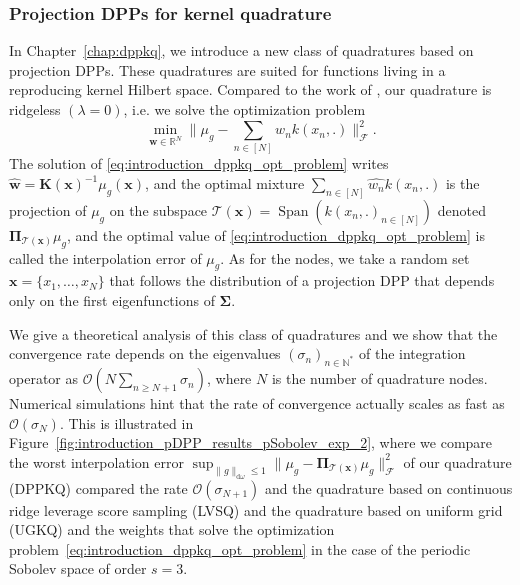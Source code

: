\documentclass[twoside,11pt]{book}
\numberwithin{theorem}{chapter}
\numberwithin{definition}{chapter}
\numberwithin{proposition}{chapter}
\numberwithin{corollary}{chapter}
\numberwithin{example}{chapter}
\numberwithin{lemma}{chapter}
\numberwithin{assumption}{chapter}
\numberwithin{equation}{chapter}
\numberwithin{figure}{chapter}
\DeclareMathOperator{\Span}{\mathrm{Span}}
\DeclareMathOperator{\F}{\mathcal{F}}
\begin{document}
\subsubsection{Projection DPPs for kernel quadrature}

In Chapter~\ref{chap:dppkq}, we introduce a new class of quadratures based on projection DPPs. These quadratures are suited for functions living in a reproducing kernel Hilbert space. Compared to the work of \cite{Bac17}, our quadrature is ridgeless $(\lambda = 0)$, i.e. we solve the optimization problem
\begin{equation}\label{eq:introduction_dppkq_opt_problem}
\min\limits_{\bm{w} \in \mathbb{R}^{N}} \|\mu_{g} - \sum\limits_{n \in [N]} w_{n}k(x_{n},.) \|_{\F}^{2}.
\end{equation}
 The solution of \eqref{eq:introduction_dppkq_opt_problem} writes $\hat{\bm{w}} = \bm{K}(\bm{x})^{-1} \mu_{g}(\bm{x})$, and the optimal mixture $\sum_{n \in [N]} \hat{w_{n}}k(x_n,.)$ is the projection of $\mu_{g}$ on the subspace $\mathcal{T}(\bm{x}) = \Span( k(x_{n},.)_{n \in [N]})$ denoted $\bm{\Pi}_{\mathcal{T}(\bm{x})}\mu_{g}$, and the optimal value of \eqref{eq:introduction_dppkq_opt_problem} is called the interpolation error of $\mu_{g}$. As for the nodes, we take a random set $\bm{x} = \{x_{1}, \dots,x_{N}\}$ that follows the distribution of a projection DPP that depends only on the first eigenfunctions of $\bm{\Sigma}$.





We give a theoretical analysis of this class of quadratures and we show that the convergence rate depends on the eigenvalues $(\sigma_{n})_{n \in \mathbb{N}^{*}}$ of the integration operator as $\mathcal{O}(N\sum_{n \geq N+1} \sigma_n)$, where $N$ is the number of quadrature nodes. Numerical simulations hint that the rate of convergence actually scales as fast as $\mathcal{O}(\sigma_{N})$. This is illustrated in Figure~\ref{fig:introduction_pDPP_results_pSobolev_exp_2}, where we compare the worst interpolation error $\sup_{\|g\|_{\mathrm{d}\omega} \leq 1}\| \mu_{g} - \bm{\Pi}_{\mathcal{T}(\bm{x})}\mu_{g}\|_{\F}^{2}$ of our quadrature (DPPKQ) compared the rate $\mathcal{O}(\sigma_{N+1})$ and the quadrature based on continuous ridge leverage score sampling (LVSQ) and the quadrature based on uniform grid (UGKQ) and the weights that solve the optimization problem~\eqref{eq:introduction_dppkq_opt_problem} in the case of the periodic Sobolev space of order $s = 3$.
\end{document}
